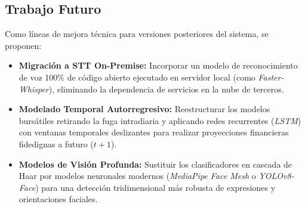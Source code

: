 \documentclass[12pt,letterpaper]{article}
\begin{document}
\subsection{Trabajo Futuro}
Como líneas de mejora técnica para versiones posteriores del sistema, se proponen:
\begin{itemize}[leftmargin=*]
    \item \textbf{Migración a STT On-Premise:} Incorporar un modelo de reconocimiento de voz 100\% de código abierto ejecutado en servidor local (como \textit{Faster-Whisper}), eliminando la dependencia de servicios en la nube de terceros.
    \item \textbf{Modelado Temporal Autorregresivo:} Reestructurar los modelos bursátiles retirando la fuga intradiaria y aplicando redes recurrentes (\textit{LSTM}) con ventanas temporales deslizantes para realizar proyecciones financieras fidedignas a futuro ($t+1$).
    \item \textbf{Modelos de Visión Profunda:} Sustituir los clasificadores en cascada de Haar por modelos neuronales modernos (\textit{MediaPipe Face Mesh} o \textit{YOLOv8-Face}) para una detección tridimensional más robusta de expresiones y orientaciones faciales.
\end{itemize}
\end{document}
